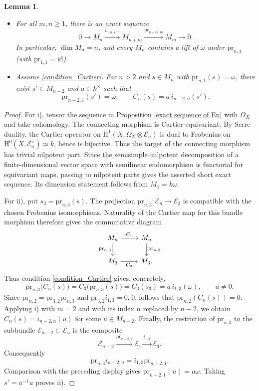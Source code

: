 \documentclass[12pt,a4]{amsart}
\newtheorem{lem}[claim]{Lemma}
\theoremstyle{definition}
\begin{document}
\begin{lem}\label{lemma 5.13}\leavevmode
\begin{itemize}
\item[i)] For all $m,n\geq1$, there is an exact sequence
\[
0\longrightarrow M_n\xrightarrow{i_{n,n+m}}M_{n+m}
\xrightarrow{\mathrm{pr}_{n+m,m}}M_m\longrightarrow0.
\]
In particular, $\dim M_n=n$, and every $M_n$ contains a lift of $\omega$
under $\mathrm{pr}_{n,1}$ (with $\mathrm{pr}_{1,1}=\mathrm{id}$).
\item[ii)] Assume \eqref{condition_Cartier}. For $n>2$ and
$s\in M_n$ with $\mathrm{pr}_{n,1}(s)=\omega$, there exist
$s'\in M_{n-2}$ and $a\in k^\times$ such that
\[
\mathrm{pr}_{n-2,1}(s')=\omega,
\qquad C_n(s)=a\,i_{n-2,n}(s').
\]
\end{itemize}
\end{lem}
\begin{proof}
For i), tensor the sequence in Proposition \ref{exact sequence of En}
with $\Omega_X$ and take cohomology. The connecting morphism is
Cartier-equivariant. By Serre duality, the Cartier operator on
$\mathrm H^1(X,\Omega_X\otimes\mathcal E_n)$ is dual to Frobenius on
$\mathrm H^0(X,\mathcal E_n^\vee)\simeq k$, hence is bijective. Thus the
target of the connecting morphism has trivial nilpotent part. Since the
semisimple--nilpotent decomposition of a finite-dimensional vector space
with semilinear endomorphism is functorial for equivariant maps, passing to
nilpotent parts gives the asserted short exact sequence. Its dimension
statement follows from $M_1=k\omega$.

For ii), put $s_3=\mathrm{pr}_{n,3}(s)$. The projection
$\mathrm{pr}_{n,3}:\mathcal E_n\to\mathcal E_3$ is compatible with the
chosen Frobenius isomorphisms. Naturality of the Cartier map for this
bundle morphism therefore gives the commutative diagram
\[
\begin{tikzcd}
M_n \arrow[r,"C_n"] \arrow[d,"\mathrm{pr}_{n,3}"']
& M_n \arrow[d,"\mathrm{pr}_{n,3}"]\\
M_3 \arrow[r,"C_3"'] & M_3.
\end{tikzcd}
\]
Thus condition \eqref{condition_Cartier} gives, concretely,
\[
\mathrm{pr}_{n,3}\bigl(C_n(s)\bigr)
=C_3\bigl(\mathrm{pr}_{n,3}(s)\bigr)
=C_3(s_3)=a\,i_{1,3}(\omega),\qquad a\ne0.
\]
Since $\mathrm{pr}_{n,2}=\mathrm{pr}_{3,2}\mathrm{pr}_{n,3}$ and
$\mathrm{pr}_{3,2}i_{1,3}=0$, it follows that
$\mathrm{pr}_{n,2}(C_n(s))=0$. Applying i) with $m=2$ and with its
index $n$ replaced by $n-2$, we obtain
$C_n(s)=i_{n-2,n}(u)$ for some $u\in M_{n-2}$.
Finally, the restriction of $\mathrm{pr}_{n,3}$ to the subbundle
$\mathcal E_{n-2}\subset\mathcal E_n$ is the composite
\[
\mathcal E_{n-2}\xrightarrow{\mathrm{pr}_{n-2,1}}\mathcal E_1
\xrightarrow{i_{1,3}}\mathcal E_3.
\]
Consequently
\[
\mathrm{pr}_{n,3}i_{n-2,n}
=i_{1,3}\mathrm{pr}_{n-2,1}.
\]
Comparison with the preceding display gives
$\mathrm{pr}_{n-2,1}(u)=a\omega$.
Taking $s'=a^{-1}u$ proves ii).
\end{proof}
\end{document}
